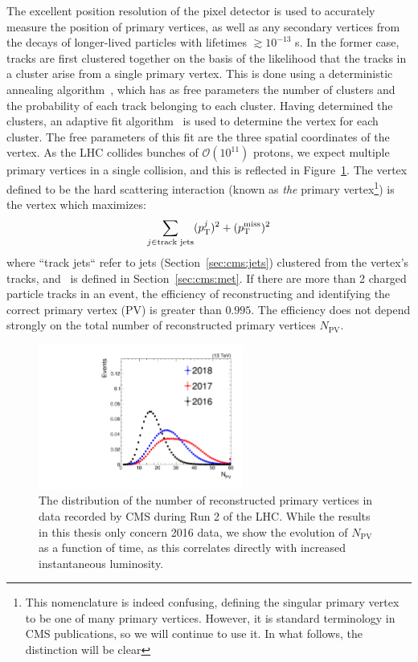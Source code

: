 The excellent position resolution of the pixel detector is used to accurately measure the position of primary vertices, as well as any secondary vertices from the decays of longer-lived particles with lifetimes $\gtrsim 10^{-13}$ s.
In the former case, tracks are first clustered together on the basis of the likelihood that the tracks in a cluster arise from a single primary vertex.
This is done using a deterministic annealing algorithm~\cite{da}, which has as free parameters the number of clusters and the probability of each track belonging to each cluster.
Having determined the clusters, an adaptive fit algorithm~\cite{adaptivefit} is used to determine the vertex for each cluster.
The free parameters of this fit are the three spatial coordinates of the vertex.
As the LHC collides bunches of $\mathcal{O}(10^{11})$ protons, we expect multiple primary vertices in a single collision, and this is reflected in Figure~\ref{fig:cms:npv}.
The vertex defined to be the hard scattering interaction (known as \emph{the} primary vertex\footnote{This nomenclature is indeed confusing, defining the singular primary vertex to be one of many primary vertices. However, it is standard terminology in CMS publications, so we will continue to use it. In what follows, the distinction will be clear}) is the vertex which maximizes:
\begin{equation}
    \sum_{j\in\text{track jets}} (p_\mathrm{T}^j)^2 + (p_\mathrm{T}^\mathrm{miss})^2
\end{equation}
where ``track jets`` refer to jets (Section~\ref{sec:cms:jets}) clustered from the vertex's tracks, and \ptmiss~is defined in Section~\ref{sec:cms:met}.
If there are more than 2 charged particle tracks in an event, the efficiency of reconstructing and identifying the correct primary vertex (PV) is greater than $0.995$.
The efficiency does not depend strongly on the total number of reconstructed primary vertices $N_\mathrm{PV}$.

\begin{figure}[]
    \begin{center} 
        \includegraphics[width=0.6\textwidth]{figures/cms/comparison_npv.pdf}
        \caption{The distribution of the number of reconstructed primary vertices in data recorded by CMS during Run 2 of the LHC.
                 While the results in this thesis only concern 2016 data, we show the evolution of $N_\mathrm{PV}$ as a function of time, as this correlates directly with increased instantaneous luminosity.}
        \label{fig:cms:npv}
    \end{center}
\end{figure}


